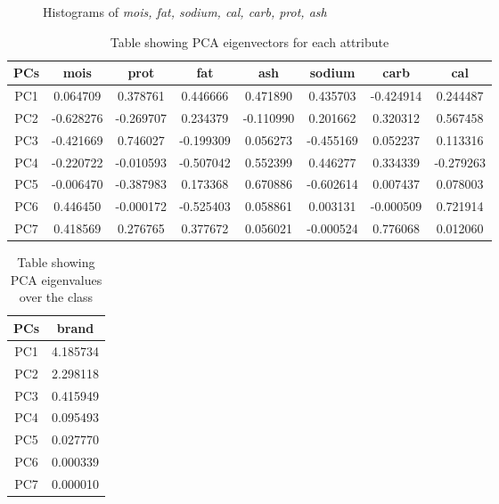 \documentclass[preprint,12pt]{elsarticle}
\begin{document}
\begin{figure}[hb]

    \caption{Histograms of \textit{mois, fat, sodium, cal, carb, prot, ash}}
    \label{fig:brands_all.png}
\end{figure}


\begin{table}[h!]
\centering
\begin{tabular}{ |c| |c| |c| |c| |c| |c| |c| |c|}
\hline
 PCs & mois & prot & fat & ash & sodium & carb & cal \\ [0.2ex]
 \hline
 PC1 & 0.064709 & 0.378761 & 0.446666 & 0.471890  & 0.435703 & -0.424914 & 0.244487 \\
 PC2 & -0.628276 & -0.269707 & 0.234379 & -0.110990  & 0.201662  & 0.320312  & 0.567458 \\
 PC3 & -0.421669 & 0.746027 & -0.199309 & 0.056273 & -0.455169 & 0.052237 & 0.113316 \\
 PC4 & -0.220722 & -0.010593 & -0.507042 & 0.552399 & 0.446277 & 0.334339 & -0.279263 \\
 PC5 & -0.006470 & -0.387983 & 0.173368 & 0.670886 & -0.602614 & 0.007437 & 0.078003 \\
 PC6 & 0.446450 & -0.000172 & -0.525403 & 0.058861 & 0.003131 & -0.000509 & 0.721914 \\
 PC7 & 0.418569 & 0.276765 & 0.377672 & 0.056021 & -0.000524 & 0.776068 & 0.012060 \\ [1ex]
  \hline\hline
\end{tabular}
\caption{Table showing PCA eigenvectors for each attribute}\label{table:eigenvectors}
\end{table}

\begin{table}[h!]
\centering
\begin{tabular}{ |c| |c| }
\hline
 PCs & brand\\ [0.2ex]
 \hline
PC1 & 4.185734 \\
PC2 & 2.298118 \\
PC3 & 0.415949 \\
PC4 & 0.095493 \\
PC5 & 0.027770 \\
PC6 & 0.000339 \\
PC7 & 0.000010 \\
  \hline\hline
\end{tabular}
\caption{Table showing PCA eigenvalues over the class}\label{table:eigenvalues}
\end{table}
\end{document}
